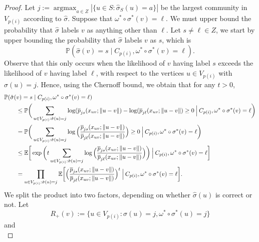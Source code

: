 \documentclass{article}
\DeclareMathOperator*{\argmax}{argmax}
\renewcommand{\P}{\mathbb{P}}
\newcommand{\E}{\mathbb{E}}
\newcommand{\1}{\mathbbm{1}}
\theoremstyle{definition}
\theoremstyle{plain}
\begin{document}
\begin{proof}
Let $j := \argmax_{a \in Z} |\{u \in S: \hat{\sigma}_S(u) = a\}|$ be the largest community in $V_{p(i)}$ according to $\hat{\sigma}$. Suppose that $\omega^* \circ \sigma^*(v) = \ell$. We must upper bound the probability that $\hat{\sigma}$ labels $v$ as anything other than $\ell$. Let $s \neq \ell \in Z$, we start by upper bounding the probability that $\hat{\sigma}$ labels $v$ as $s$, which is 
\begin{equation*}
    \P(\hat{\sigma}(v) = s \mid C_{p(i)}, \omega^* \circ \sigma^*(v) = \ell).
\end{equation*}
Observe that this only occurs when the likelihood of $v$ having label $s$ exceeds the likelihood of $v$ having label $\ell$, with respect to the vertices $u \in V_{p(i)}$ with $\hat{\sigma}(u) = j$. Hence, using the Chernoff bound, we obtain that for any $t > 0$,
\begin{align}
\label{eq:propagate_single_vertex_error_1}
    &\P(\hat{\sigma}(v) = s \mid C_{p(i)}, \omega^* \circ \sigma^*(v) = \ell) \notag \\
    &\qquad\leq \P\bigg(\sum_{u \in V_{p(i)}: \hat{\sigma}(u) = j} \log(\overline{p}_{js}(x_{uv};\|u-v\|) - \log(\overline{p}_{j\ell}(x_{uv};\|u-v\|) \geq 0 \: \Big| \: C_{p(i)}, \omega^* \circ \sigma^*(v) = \ell \bigg) \notag \\
    &\qquad= \P\bigg(\sum_{u \in V_{p(i)}: \hat{\sigma}(u) = j} \log\Big(\frac{\overline{p}_{js}(x_{uv};\|u-v\|)}{\overline{p}_{j\ell}(x_{uv};\|u-v\|)}\Big) \geq 0 \: \Big| \: C_{p(i)}, \omega^* \circ \sigma^*(v) = \ell \bigg) \notag \\
    &\qquad\leq \E\bigg[\exp\bigg(t\sum_{u \in V_{p(i)}: \hat{\sigma}(u) = j} \log\Big(\frac{\overline{p}_{js}(x_{uv};\|u-v\|)}{\overline{p}_{j\ell}(x_{uv};\|u-v\|)}\Big)\bigg) \: \Big| \: C_{p(i)}, \omega^* \circ \sigma^*(v) = \ell \bigg] \notag \\
    &\qquad= \prod_{u \in V_{p(i)}:\hat{\sigma}(u)=j} \E\bigg[ \Big(\frac{\overline{p}_{js}(x_{uv};\|u-v\|)}{\overline{p}_{j\ell}(x_{uv};\|u-v\|)}\Big)^t \: \Big| \: C_{p(i)}, \omega^* \circ \sigma^*(v) = \ell \bigg].
\end{align}
We split the product into two factors, depending on whether $\hat{\sigma}(u)$ is correct or not. Let
\begin{equation*}
    R_+(v) := \{u \in V_{p(i)}: \hat{\sigma}(u) = j, \omega^* \circ \sigma^*(u) = j\}
\end{equation*}
and 
\begin{equation*}

\end{equation*}
\end{proof}
\end{document}
